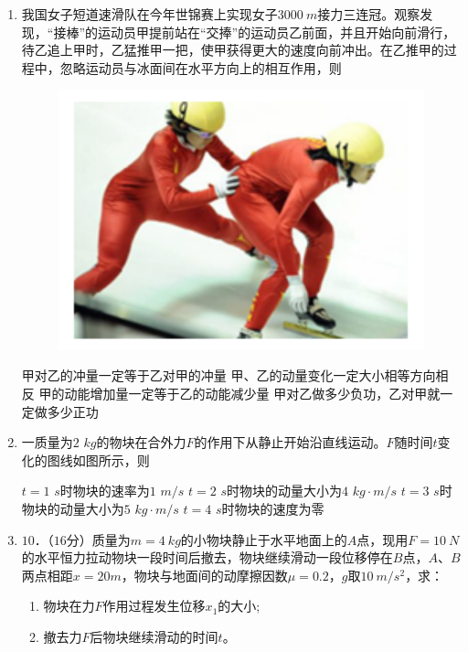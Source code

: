 \begin{enumerate}[leftmargin=0em]
{\begin{enumerate}
\end{enumerate}


}


\item 
{}
我国女子短道速滑队在今年世锦赛上实现女子$ 3000 \ m $接力三连冠。观察发现，“接棒”的运动员甲提前站在“交捧”的运动员乙前面，并且开始向前滑行，待乙追上甲时，乙猛推甲一把，使甲获得更大的速度向前冲出。在乙推甲的过程中，忽略运动员与冰面间在水平方向上的相互作用，则  
\begin{figure}[h!]
\centering
\includegraphics[width=0.3\linewidth]{picture/screenshot002}
\end{figure}



\fourchoices
{甲对乙的冲量一定等于乙对甲的冲量}
{甲、乙的动量变化一定大小相等方向相反}
{甲的动能增加量一定等于乙的动能减少量}
{甲对乙做多少负功，乙对甲就一定做多少正功}



\item 
{}
一质量为$ 2 $ $ kg $的物块在合外力$ F $的作用下从静止开始沿直线运动。$ F $随时间$ t $变化的图线如图所示，则  
\begin{figure}[h!]
\centering

\end{figure}

\fourchoices
{$ t=1 $ $ s $时物块的速率为$ 1 $ $ m/s $}
{$ t=2 $ $ s $时物块的动量大小为$ 4 $ $ kg \cdot m/s $}
{$ t=3 $ $ s $时物块的动量大小为$ 5 $ $ kg \cdot m/s $}
{$ t=4 $ $ s $时物块的速度为零}


\item
{}	
$ 10 $．（$ 16 $分）质量为$ m=4 \ kg $的小物块静止于水平地面上的$ A $点，现用$ F=10 \ N $的水平恒力拉动物块一段时间后撤去，物块继续滑动一段位移停在$ B $点，$ A $、$ B $两点相距$ x=20m $，物块与地面间的动摩擦因数$ \mu =0.2 $，$ g $取$ 10 \ m/s^{2} $，求：
\begin{enumerate}
\renewcommand{\labelenumi}{\arabic{enumi}.}
\item
物块在力$ F $作用过程发生位移$ x_{1} $的大小;
\item 
撤去力$ F $后物块继续滑动的时间$ t $。



\end{enumerate}
\end{enumerate}
